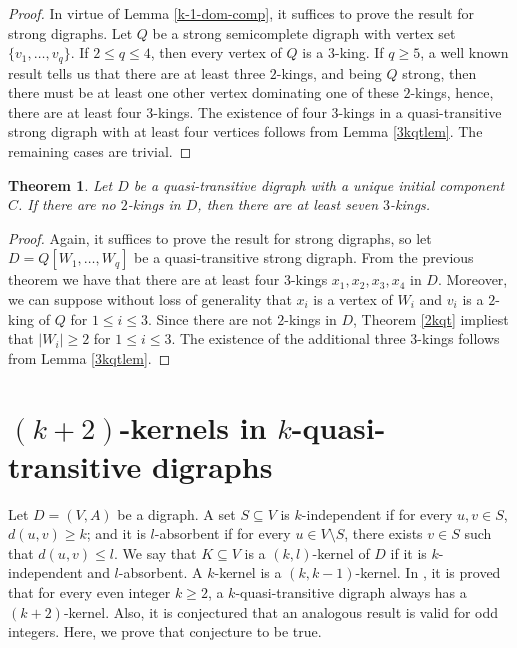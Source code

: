 \documentclass[preprint]{elsarticle}
\newtheorem{thm}{Theorem}[section]
\begin{document}
\begin{proof}
	 In virtue of Lemma \ref{k-1-dom-comp}, it suffices to prove the result for strong digraphs.   Let $Q$ be a strong semicomplete digraph with vertex set $\{ v_1, \dots, v_q \}$.   If $2 \le q \le 4$, then every vertex of $Q$ is a $3$-king.   If $q \ge 5$, a well known result tells us that there are at least three $2$-kings, and being $Q$ strong, then there must be at least one other vertex dominating one of these $2$-kings, hence, there are at least four $3$-kings.   The existence of four $3$-kings in a quasi-transitive strong digraph with at least four vertices follows from Lemma \ref{3kqtlem}.   The remaining cases are trivial.
\end{proof}

\begin{thm}
	Let $D$ be a quasi-transitive digraph with a unique initial component $C$.   If there are no $2$-kings in $D$, then there are at least seven $3$-kings.
\end{thm}

\begin{proof}
	Again, it suffices to prove the result for strong digraphs, so let $D = Q[W_1, \dots, W_q]$ be a quasi-transitive strong digraph.   From the previous theorem we have that there are at least four $3$-kings $x_1, x_2, x_3, x_4$ in $D$.   Moreover, we can suppose without loss of generality that $x_i$ is a vertex of $W_i$ and $v_i$ is a $2$-king of $Q$ for $1 \le i \le 3$.   Since there are not $2$-kings in $D$, Theorem \ref{2kqt} impliest that $|W_i| \ge 2$ for $1 \le i \le 3$.   The existence of the additional three $3$-kings follows from Lemma \ref{3kqtlem}.
\end{proof}















\section{$(k+2)$-kernels in $k$-quasi-transitive digraphs} \label{kernels}

Let $D= (V, A)$ be a digraph.   A set $S \subseteq V$ is $k$-independent if for every $u,v \in S$, $d(u,v) \ge k$; and it is $l$-absorbent if for every $u \in V \setminus S$, there exists $v \in S$ such that $d(u,v) \le l$.   We say that $K \subseteq V$ is a $(k,l)$-kernel of $D$ if it is $k$-independent and $l$-absorbent.   A $k$-kernel is a $(k,k-1)$-kernel.   In \cite{GS-HC}, it is proved that for every even integer $k \ge 2$, a $k$-quasi-transitive digraph always has a $(k+2)$-kernel.   Also, it is conjectured that an analogous result is valid for odd integers.   Here, we prove that conjecture to be true.
\end{document}

